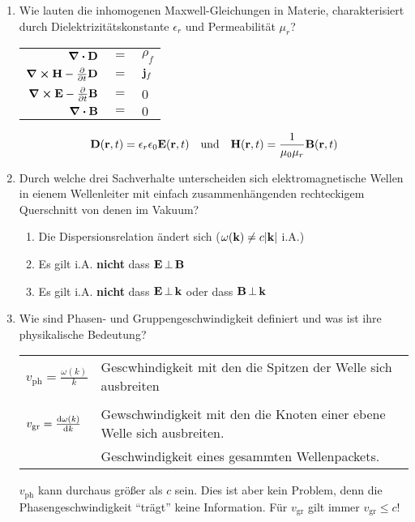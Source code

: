 \documentclass{scrartcl}
\begin{document}
\begin{enumerate}
    \item Wie lauten die inhomogenen Maxwell-Gleichungen in Materie,
          charakterisiert durch Dielektrizitätskonstante $\epsilon_r$ und
          Permeabilität $\mu_r$?
          \begin{center}
            \begin{tabular}{rcl}
              $\div \vb D$ & $=$ &$\rho_f$\\
              $\curl \vb H-\pdv{t}\vb D$ & $=$ &$\vb j_f$\\
              $\curl \vb E-\pdv{t}\vb B$ & $=$ &$0$\\
              $\div \vb B$ & $=$ &$0$\\
            \end{tabular}
            $$\vb D(\vb r,t)=\epsilon_r\epsilon_0\vb E(\vb r,t) \quad
            \text{und}\quad\vb H(\vb r, t)=\frac{1}{\mu_0\mu_r}
            \vb B(\vb r,t)$$
          \end{center}

    \item Durch welche drei Sachverhalte unterscheiden sich 
          elektromagnetische Wellen in eienem Wellenleiter mit einfach
          zusammenhängenden rechteckigem Querschnitt von denen im Vakuum?
          \begin{enumerate}
            \item Die Dispersionsrelation ändert sich 
                  ($\omega(\vb k)\ne c\abs{\vb k}$ i.A.)
            \item Es gilt i.A. \textbf{nicht} dass $\vb E\,\bot\,\vb B$
            \item Es gilt i.A. \textbf{nicht} dass $\vb E\,\bot\,\vb k$
                  oder dass $\vb B\,\bot\,\vb k$
          \end{enumerate}

    \item Wie sind Phasen- und Gruppengeschwindigkeit definiert und was ist
          ihre physikalische Bedeutung?
          \begin{center}
            \begin{tabular}{ll}
              $v_{\text{ph}}=\frac{\omega(k)}{k}$ 
                        &Gescwhindigkeit mit 
                         den die Spitzen der Welle sich ausbreiten\\\\
          $v_{\text{gr}}=\dv{\omega(k)}{k}$
                        &Gewschwindigkeit mit
                         den die Knoten einer ebene Welle sich ausbreiten.\\
                        &Geschwindigkeit eines gesammten Wellenpackets.\\
            \end{tabular}
          \end{center}
          $v_{\text{ph}}$ kann durchaus größer als $c$ sein. Dies ist aber
          kein Problem, denn die Phasengeschwindigkeit ``trägt'' keine
          Information. Für $v_{\text{gr}}$ gilt immer $v_{\text{gr}}\le c$!


\end{enumerate}
\end{document}
